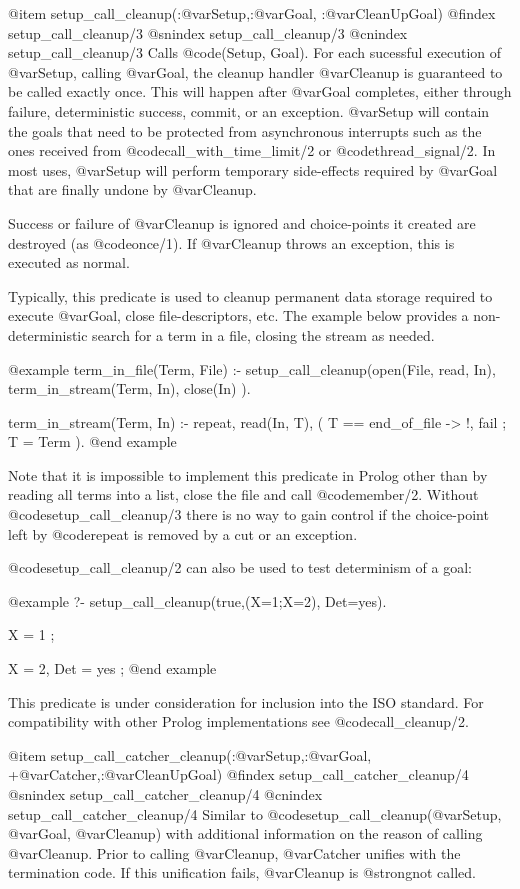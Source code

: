 {{{{{{{{{@item setup_call_cleanup(:@var{Setup},:@var{Goal}, :@var{CleanUpGoal})
@findex setup_call_cleanup/3
@snindex setup_call_cleanup/3
@cnindex setup_call_cleanup/3
Calls @code{(Setup, Goal)}. For each sucessful execution of @var{Setup}, calling @var{Goal}, the
cleanup handler @var{Cleanup} is guaranteed to be called exactly once.
This will happen after @var{Goal} completes, either through failure,
deterministic success, commit, or an exception.  @var{Setup} will
contain the goals that need to be protected from asynchronous interrupts
such as the ones received from @code{call_with_time_limit/2} or @code{thread_signal/2}.  In
most uses, @var{Setup} will perform temporary side-effects required by
@var{Goal} that are finally undone by @var{Cleanup}.

Success or failure of @var{Cleanup} is ignored and choice-points it
created are destroyed (as @code{once/1}). If @var{Cleanup} throws an exception,
this is executed as normal.

Typically, this predicate is used to cleanup permanent data storage
required to execute @var{Goal}, close file-descriptors, etc. The example
below provides a non-deterministic search for a term in a file, closing
the stream as needed.

@example
term_in_file(Term, File) :-
	setup_call_cleanup(open(File, read, In),
			   term_in_stream(Term, In),
			   close(In) ).

term_in_stream(Term, In) :-
	repeat,
	read(In, T),
	(   T == end_of_file
	->  !, fail
	;   T = Term
	).
@end example

Note that it is impossible to implement this predicate in Prolog other than
by reading all terms into a list, close the file and call @code{member/2}.
Without @code{setup_call_cleanup/3} there is no way to gain control if the
choice-point left by @code{repeat} is removed by a cut or an exception.

@code{setup_call_cleanup/2} can also be used to test determinism of a goal:

@example
?- setup_call_cleanup(true,(X=1;X=2), Det=yes).

X = 1 ;

X = 2,
Det = yes ;
@end example

This predicate is under consideration for inclusion into the ISO standard.
For compatibility with other Prolog implementations see @code{call_cleanup/2}.

 @item setup_call_catcher_cleanup(:@var{Setup},:@var{Goal}, +@var{Catcher},:@var{CleanUpGoal})
@findex setup_call_catcher_cleanup/4
@snindex setup_call_catcher_cleanup/4
@cnindex setup_call_catcher_cleanup/4
Similar to @code{setup_call_cleanup(@var{Setup}, @var{Goal}, @var{Cleanup})} with
additional information on the reason of calling @var{Cleanup}.  Prior
to calling @var{Cleanup}, @var{Catcher} unifies with the termination
code.  If this unification fails, @var{Cleanup} is
@strong{not} called.


}}}}}}}}}
